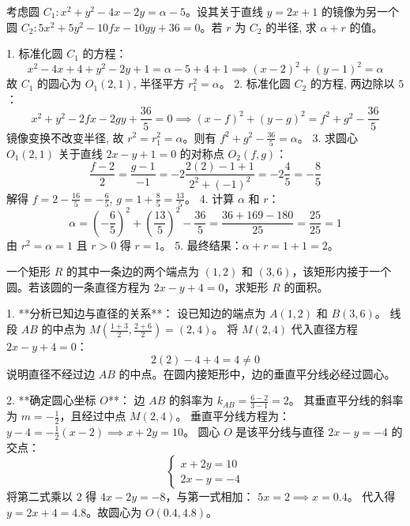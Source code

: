 \begin{questions}
\question
考虑圆 $C_1 : x^2 + y^2 - 4x - 2y = \alpha - 5$。设其关于直线 $y = 2x + 1$ 的镜像为另一个圆 $C_2 : 5x^2 + 5y^2 - 10fx - 10gy + 36 = 0$。若 $r$ 为 $C_2$ 的半径, 求 $\alpha + r$ 的值。

\begin{solution}
1. 标准化圆 $C_1$ 的方程：
\[
x^2 - 4x + 4 + y^2 - 2y + 1 = \alpha - 5 + 4 + 1 \implies (x - 2)^2 + (y - 1)^2 = \alpha
\]
故 $C_1$ 的圆心为 $O_1(2, 1)$, 半径平方 $r_1^2 = \alpha$。
2. 标准化圆 $C_2$ 的方程, 两边除以 $5$：
\[
x^2 + y^2 - 2fx - 2gy + \frac{36}{5} = 0 \implies (x - f)^2 + (y - g)^2 = f^2 + g^2 - \frac{36}{5}
\]
镜像变换不改变半径, 故 $r^2 = r_1^2 = \alpha$。则有 $f^2 + g^2 - \frac{36}{5} = \alpha$。
3. 求圆心 $O_1(2, 1)$ 关于直线 $2x - y + 1 = 0$ 的对称点 $O_2(f, g)$：
\[
\frac{f - 2}{2} = \frac{g - 1}{-1} = -2 \frac{2(2) - 1 + 1}{2^2 + (-1)^2} = -2 \frac{4}{5} = -\frac{8}{5}
\]
解得 $f = 2 - \frac{16}{5} = -\frac{6}{5}$, $g = 1 + \frac{8}{5} = \frac{13}{5}$。
4. 计算 $\alpha$ 和 $r$：
\[
\alpha = \left( -\frac{6}{5} \right)^2 + \left( \frac{13}{5} \right)^2 - \frac{36}{5} = \frac{36 + 169 - 180}{25} = \frac{25}{25} = 1
\]
由 $r^2 = \alpha = 1$ 且 $r > 0$ 得 $r = 1$。
5. 最终结果：$\alpha + r = 1 + 1 = 2$。
\end{solution}

\question
一个矩形 $R$ 的其中一条边的两个端点为 $(1, 2)$ 和 $(3, 6)$，该矩形内接于一个圆。若该圆的一条直径方程为 $2x - y + 4 = 0$，求矩形 $R$ 的面积。

\begin{solution}
1. **分析已知边与直径的关系**：
   设已知边的端点为 $A(1, 2)$ 和 $B(3, 6)$。
   线段 $AB$ 的中点为 $M\left( \frac{1+3}{2}, \frac{2+6}{2} \right) = (2, 4)$。
   将 $M(2, 4)$ 代入直径方程 $2x - y + 4 = 0$：
   \[ 2(2) - 4 + 4 = 4 \neq 0 \]
   说明直径不经过边 $AB$ 的中点。在圆内接矩形中，边的垂直平分线必经过圆心。

2. **确定圆心坐标 $O$**：
   边 $AB$ 的斜率为 $k_{AB} = \frac{6 - 2}{3 - 1} = 2$。
   其垂直平分线的斜率为 $m = -\frac{1}{2}$，且经过中点 $M(2, 4)$。
   垂直平分线方程为：$y - 4 = -\frac{1}{2}(x - 2) \implies x + 2y = 10$。
   圆心 $O$ 是该平分线与直径 $2x - y = -4$ 的交点：
   \[ \begin{cases} x + 2y = 10 \\ 2x - y = -4 \end{cases} \]
   将第二式乘以 $2$ 得 $4x - 2y = -8$，与第一式相加：
   $5x = 2 \implies x = 0.4$。
   代入得 $y = 2x + 4 = 4.8$。故圆心为 $O(0.4, 4.8)$。




\end{solution}
\end{questions}

